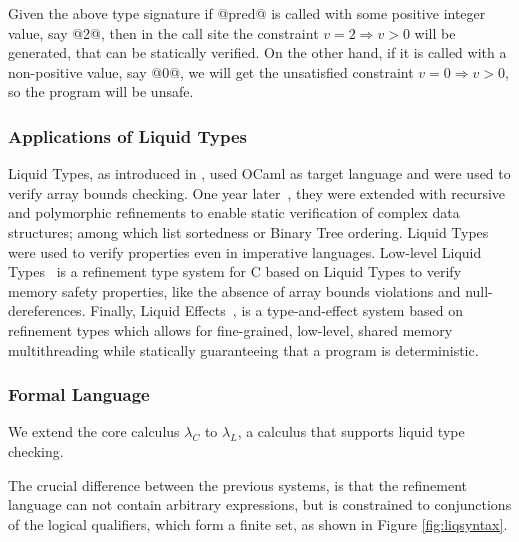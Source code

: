 Given the above type signature 
if @pred@ is called with some positive integer value, say @2@,
then in the call site the constraint $v = 2 \Rightarrow v >0$ will be generated, 
that can be statically verified.
%
On the other hand, if it is called with a non-positive value, 
say @0@, we will get the unsatisfied constraint
$v = 0 \Rightarrow v > 0$, 
so the program will be unsafe.

\subsubsection{Applications of Liquid Types}
Liquid Types, as introduced in \cite{LiquidPLDI08}, used OCaml as target language
and were used to verify array bounds checking.
One year later~\cite{LiquidPLDI09}, they were extended with recursive and polymorphic refinements
to enable static verification of complex data structures; among which 
list sortedness or Binary Tree ordering.
%
Liquid Types were used to verify properties even in imperative languages.
Low-level Liquid Types~\cite{Rondon10} is a refinement type system for
C based on Liquid Types to verify memory safety properties, 
like the absence of array bounds violations
and null-dereferences.
Finally, Liquid Effects~\cite{Kawaguchi12},
is a type-and-effect system based on refinement types
which allows for fine-grained, low-level, shared memory multithreading while statically guaranteeing that a program is deterministic. 

\subsubsection{Formal Language}
We extend the core calculus $\lambda_C$ to $\lambda_L$, 
a calculus that supports liquid type checking.

The crucial difference between the previous systems, is that 
the refinement language 
can not contain arbitrary expressions, but 
is constrained
to conjunctions of the logical qualifiers, which form a finite set, 
as shown in Figure \ref{fig:liqsyntax}.


